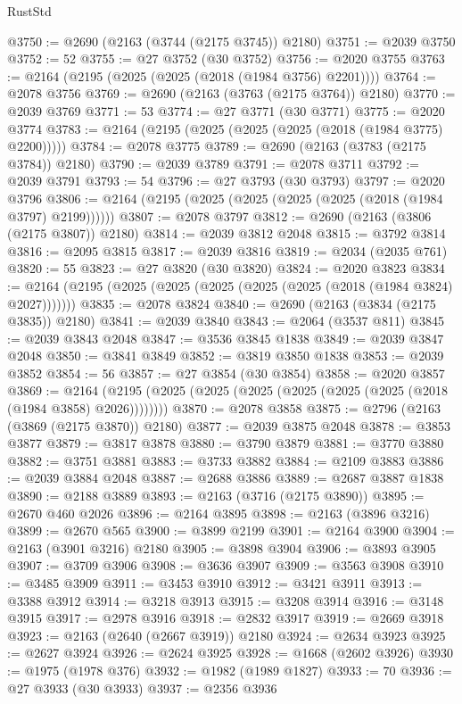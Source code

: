 \begin{lexlean}{RustStd}
\begin{coremodule}
@3750 := @2690 (@2163 (@3744 (@2175 @3745)) @2180)
@3751 := @2039 @3750
@3752 := 52
@3755 := @27 @3752 (@30 @3752)
@3756 := @2020 @3755
@3763 := @2164 (@2195 (@2025 (@2025 (@2018 (@1984 @3756) @2201))))
@3764 := @2078 @3756
@3769 := @2690 (@2163 (@3763 (@2175 @3764)) @2180)
@3770 := @2039 @3769
@3771 := 53
@3774 := @27 @3771 (@30 @3771)
@3775 := @2020 @3774
@3783 := @2164 (@2195 (@2025 (@2025 (@2025 (@2018 (@1984 @3775) @2200)))))
@3784 := @2078 @3775
@3789 := @2690 (@2163 (@3783 (@2175 @3784)) @2180)
@3790 := @2039 @3789
@3791 := @2078 @3711
@3792 := @2039 @3791
@3793 := 54
@3796 := @27 @3793 (@30 @3793)
@3797 := @2020 @3796
@3806 := @2164 (@2195 (@2025 (@2025 (@2025 (@2025 (@2018 (@1984 @3797) @2199))))))
@3807 := @2078 @3797
@3812 := @2690 (@2163 (@3806 (@2175 @3807)) @2180)
@3814 := @2039 @3812 @2048
@3815 := @3792 @3814
@3816 := @2095 @3815
@3817 := @2039 @3816
@3819 := @2034 (@2035 @761)
@3820 := 55
@3823 := @27 @3820 (@30 @3820)
@3824 := @2020 @3823
@3834 := @2164 (@2195 (@2025 (@2025 (@2025 (@2025 (@2025 (@2018 (@1984 @3824) @2027)))))))
@3835 := @2078 @3824
@3840 := @2690 (@2163 (@3834 (@2175 @3835)) @2180)
@3841 := @2039 @3840
@3843 := @2064 (@3537 @811)
@3845 := @2039 @3843 @2048
@3847 := @3536 @3845 @1838
@3849 := @2039 @3847 @2048
@3850 := @3841 @3849
@3852 := @3819 @3850 @1838
@3853 := @2039 @3852
@3854 := 56
@3857 := @27 @3854 (@30 @3854)
@3858 := @2020 @3857
@3869 := @2164 (@2195 (@2025 (@2025 (@2025 (@2025 (@2025 (@2025 (@2018 (@1984 @3858) @2026))))))))
@3870 := @2078 @3858
@3875 := @2796 (@2163 (@3869 (@2175 @3870)) @2180)
@3877 := @2039 @3875 @2048
@3878 := @3853 @3877
@3879 := @3817 @3878
@3880 := @3790 @3879
@3881 := @3770 @3880
@3882 := @3751 @3881
@3883 := @3733 @3882
@3884 := @2109 @3883
@3886 := @2039 @3884 @2048
@3887 := @2688 @3886
@3889 := @2687 @3887 @1838
@3890 := @2188 @3889
@3893 := @2163 (@3716 (@2175 @3890))
@3895 := @2670 @460 @2026
@3896 := @2164 @3895
@3898 := @2163 (@3896 @3216)
@3899 := @2670 @565
@3900 := @3899 @2199
@3901 := @2164 @3900
@3904 := @2163 (@3901 @3216) @2180
@3905 := @3898 @3904
@3906 := @3893 @3905
@3907 := @3709 @3906
@3908 := @3636 @3907
@3909 := @3563 @3908
@3910 := @3485 @3909
@3911 := @3453 @3910
@3912 := @3421 @3911
@3913 := @3388 @3912
@3914 := @3218 @3913
@3915 := @3208 @3914
@3916 := @3148 @3915
@3917 := @2978 @3916
@3918 := @2832 @3917
@3919 := @2669 @3918
@3923 := @2163 (@2640 (@2667 @3919)) @2180
@3924 := @2634 @3923
@3925 := @2627 @3924
@3926 := @2624 @3925
@3928 := @1668 (@2602 @3926)
@3930 := @1975 (@1978 @376)
@3932 := @1982 (@1989 @1827)
@3933 := 70
@3936 := @27 @3933 (@30 @3933)
@3937 := @2356 @3936

\end{coremodule}
\end{lexlean}
